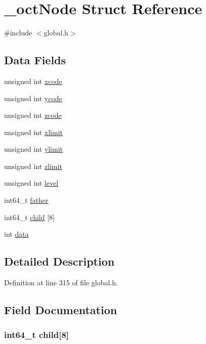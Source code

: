 \hypertarget{struct__octNode}{\section{\-\_\-oct\-Node Struct Reference}
\label{struct__octNode}
}


{\ttfamily \#include $<$global.\-h$>$}

\subsection*{Data Fields}
\begin{DoxyCompactItemize}
\item 
unsigned int \hyperlink{struct__octNode_abf1b4fc0b884c24d8809d956a03e3886}{xcode}
\item 
unsigned int \hyperlink{struct__octNode_a4b6e50c81688bebd12ba2adedbcda9a1}{ycode}
\item 
unsigned int \hyperlink{struct__octNode_ab506fe856c958db3cb3e76607f0f73d3}{zcode}
\item 
unsigned int \hyperlink{struct__octNode_abf5a7905067426a571446ca0cc08f4f2}{xlimit}
\item 
unsigned int \hyperlink{struct__octNode_a9cccedbe80d5a483a64720353228cb2d}{ylimit}
\item 
unsigned int \hyperlink{struct__octNode_a8a5b654c5671a06aaffd1a8ba23f2be1}{zlimit}
\item 
unsigned int \hyperlink{struct__octNode_a9082f945c1d289684d0bcd51ee08e11e}{level}
\item 
int64\-\_\-t \hyperlink{struct__octNode_a01857805a0485a378222abf4cceded07}{father}
\item 
int64\-\_\-t \hyperlink{struct__octNode_a436082644033f00fa1dd628aee81b270}{child} \mbox{[}8\mbox{]}
\item 
int \hyperlink{struct__octNode_a9eab91667db4d35c7231dcddf7b89a76}{data}
\end{DoxyCompactItemize}


\subsection{Detailed Description}


Definition at line 315 of file global.\-h.



\subsection{Field Documentation}
\hypertarget{struct__octNode_a436082644033f00fa1dd628aee81b270}{
\subsubsection[{child}]{\setlength{\rightskip}{0pt plus 5cm}int64\-\_\-t child\mbox{[}8\mbox{]}}}\label{struct__octNode_a436082644033f00fa1dd628aee81b270}


